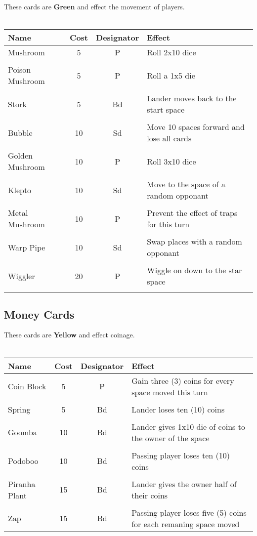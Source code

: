 \documentclass{article}
\begin{document}
These cards are \textbf{Green} and effect the movement of players.
\\\\

\begin{tabular}{lccp{5cm}}
\textbf{Name} & \textbf{Cost} & \textbf{Designator} & \textbf{Effect} \\
\hline
Mushroom & 5 & P & Roll 2x10 dice \\
&&& \\
Poison Mushroom & 5 & P & Roll a 1x5 die \\
&&& \\
Stork & 5 & Bd & Lander moves back to the start space \\
&&& \\
Bubble & 10 & Sd & Move 10 spaces forward and lose all cards \\
&&& \\
Golden Mushroom & 10 & P & Roll 3x10 dice \\
&&& \\
Klepto & 10 & Sd & Move to the space of a random opponant \\
&&& \\
Metal Mushroom & 10 & P & Prevent the effect of traps for this turn \\
&&& \\
Warp Pipe & 10 & Sd & Swap places with a random opponant \\
&&& \\
Wiggler & 20 & P & Wiggle on down to the star space \\
&&& \\
\end{tabular}

\subsection{Money Cards}

These cards are \textbf{Yellow} and effect coinage.
\\\\

\begin{tabular}{lccp{5cm}}
\textbf{Name} & \textbf{Cost} & \textbf{Designator} & \textbf{Effect} \\
\hline
Coin Block & 5 & P & Gain three (3) coins for every space moved this turn \\
&&& \\
Spring & 5 & Bd & Lander loses ten (10) coins \\
&&& \\
Goomba & 10 & Bd & Lander gives 1x10 die of coins to the owner of the space \\
&&& \\
Podoboo & 10 & Bd & Passing player loses ten (10) coins \\
&&& \\
Piranha Plant & 15 & Bd & Lander gives the owner half of their coins \\
&&& \\
Zap & 15 & Bd & Passing player loses five (5) coins for each remaning space moved \\
\end{tabular}
\end{document}
